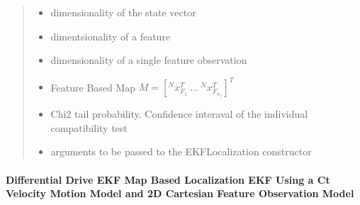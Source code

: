 \documentclass[letterpaper,10pt,english]{sphinxmanual}
\begin{document}
\begin{fulllineitems}
\begin{fulllineitems}
\begin{quote}
\begin{description}
\begin{itemize}
\item {} 
\sphinxAtStartPar
{} \textendash{} dimensionality of the state vector

\item {} 
\sphinxAtStartPar
{} \textendash{} dimentsionality of a feature

\item {} 
\sphinxAtStartPar
{} \textendash{} dimensionality of a single feature observation

\item {} 
\sphinxAtStartPar
{} \textendash{} Feature Based Map \(M =[^Nx_{F_1}^T~...~^Nx_{F_{n_f}}^T]^T\)

\item {} 
\sphinxAtStartPar
{} \textendash{} Chi2 tail probability. Confidence interaval of the individual compatibility test

\item {} 
\sphinxAtStartPar
{} \textendash{} arguments to be passed to the EKFLocalization constructor

\end{itemize}

\end{description}\end{quote}

\end{fulllineitems}


\end{fulllineitems}



\paragraph{Differential Drive EKF Map Based Localization EKF Using a Ct Velocity Motion Model and 2D Cartesian Feature Observation Model}
\label{\detokenize{FEKFMBLocalization:differential-drive-ekf-map-based-localization-ekf-using-a-ct-velocity-motion-model-and-2d-cartesian-feature-observation-model}}
\begin{figure}[htbp]
\centering

\noindent{}
\end{figure}
\end{document}

